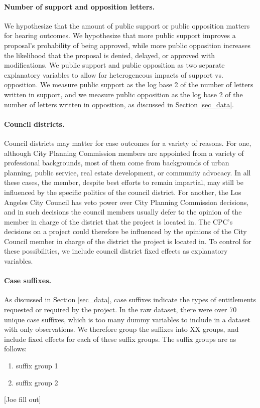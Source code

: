 \paragraph{Number of support and opposition letters.} We hypothesize that the amount of public support or public opposition matters for hearing outcomes. We hypothesize that more public support improves a proposal's probability of being approved, while more public opposition increases the likelihood that the proposal is denied, delayed, or approved with modifications. We public support and public opposition as two separate explanatory variables to allow for heterogeneous impacts of support vs. opposition. We measure public support as the log base 2 of the number of letters written in support, and we measure public opposition as the log base 2 of the number of letters written in opposition, as discussed in Section \ref{sec_data}. 

\paragraph{Council districts.} Council districts may matter for case outcomes for a variety of reasons. For one, although City Planning Commission members are appointed from a variety of professional backgrounds, most of them come from backgrounds of urban planning, public service, real estate development, or community advocacy. In all these cases, the member, despite best efforts to remain impartial, may still be influenced by the specific politics of the council district. For another, the Los Angeles City Council has veto power over City Planning Commission decisions, and in such decisions the council members usually defer to the opinion of the member in charge of the district that the project is located in. The CPC's decisions on a project could therefore be influenced by the opinions of the City Council member in charge of the district the project is located in. To control for these possibilities, we include council district fixed effects as explanatory variables.

\paragraph{Case suffixes.} As discussed in Section \ref{sec_data}, case suffixes indicate the types of entitlements requested or required by the project. In the raw dataset, there were over 70 unique case suffixes, which is too many dummy variables to include in a dataset with only  observations. We therefore group the suffixes into XX groups, and include fixed effects for each of these suffix groups. The suffix groups are as follows:
\begin{enumerate}
\item suffix group 1
\item suffix group 2
\end{enumerate}
[Joe fill out]









